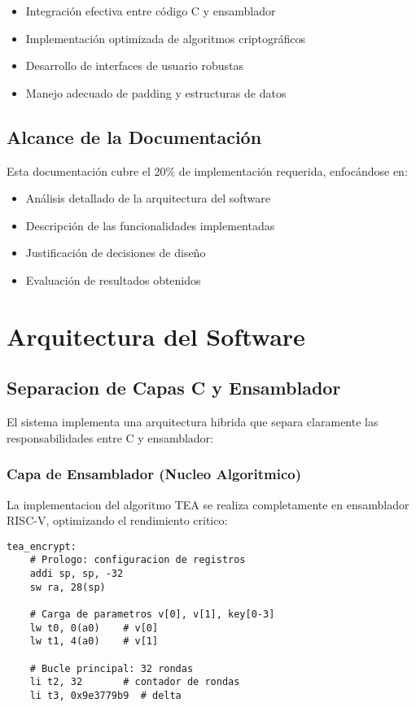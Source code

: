 \documentclass[12pt,a4paper]{article}
\begin{document}
\begin{itemize}
    \item Integración efectiva entre código C y ensamblador
    \item Implementación optimizada de algoritmos criptográficos
    \item Desarrollo de interfaces de usuario robustas
    \item Manejo adecuado de padding y estructuras de datos
\end{itemize}

\subsection{Alcance de la Documentación}

Esta documentación cubre el 20\% de implementación requerida, enfocándose en:

\begin{itemize}
    \item Análisis detallado de la arquitectura del software
    \item Descripción de las funcionalidades implementadas
    \item Justificación de decisiones de diseño
    \item Evaluación de resultados obtenidos
\end{itemize}

\section{Arquitectura del Software}

\subsection{Separacion de Capas C y Ensamblador}

El sistema implementa una arquitectura hibrida que separa claramente las responsabilidades entre C y ensamblador:

\subsubsection{Capa de Ensamblador (Nucleo Algoritmico)}
La implementacion del algoritmo TEA se realiza completamente en ensamblador RISC-V, optimizando el rendimiento critico:

\begin{lstlisting}[caption=Estructura de Encriptacion TEA]
tea_encrypt:
    # Prologo: configuracion de registros
    addi sp, sp, -32
    sw ra, 28(sp)
    
    # Carga de parametros v[0], v[1], key[0-3]
    lw t0, 0(a0)    # v[0]
    lw t1, 4(a0)    # v[1]
    
    # Bucle principal: 32 rondas
    li t2, 32       # contador de rondas
    li t3, 0x9e3779b9  # delta
\end{lstlisting}
\end{document}
